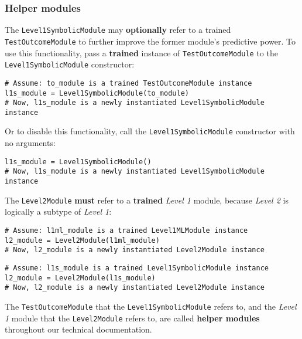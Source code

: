 \documentclass[a4paper]{article}
\begin{document}
\subsubsection{Helper modules} \label{helper_modules}

The \lstinline{Level1SymbolicModule} may \textbf{optionally} refer to a trained \lstinline{TestOutcomeModule} to further improve the former module's predictive power. To use this functionality, pass a \textbf{trained} instance of \lstinline{TestOutcomeModule} to the \lstinline{Level1SymbolicModule} constructor:

\lstset{language=Python}
\begin{lstlisting}
# Assume: to_module is a trained TestOutcomeModule instance
l1s_module = Level1SymbolicModule(to_module)
# Now, l1s_module is a newly instantiated Level1SymbolicModule instance
\end{lstlisting}
\lstset{language=}

Or to disable this functionality, call the \lstinline{Level1SymbolicModule} constructor with no arguments:

\lstset{language=Python}
\begin{lstlisting}
l1s_module = Level1SymbolicModule()
# Now, l1s_module is a newly instantiated Level1SymbolicModule instance
\end{lstlisting}
\lstset{language=}

The \lstinline{Level2Module} \textbf{must} refer to a \textbf{trained} \textit{Level 1} module, because \textit{Level 2} is logically a subtype of \textit{Level 1}:

\lstset{language=Python}
\begin{lstlisting}
# Assume: l1ml_module is a trained Level1MLModule instance
l2_module = Level2Module(l1ml_module)
# Now, l2_module is a newly instantiated Level2Module instance
\end{lstlisting}
\lstset{language=}

\lstset{language=Python}
\begin{lstlisting}
# Assume: l1s_module is a trained Level1SymbolicModule instance
l2_module = Level2Module(l1s_module)
# Now, l2_module is a newly instantiated Level2Module instance
\end{lstlisting}
\lstset{language=}

The \lstinline{TestOutcomeModule} that the \lstinline{Level1SymbolicModule} refers to, and the \textit{Level 1} module that the \lstinline{Level2Module} refers to, are called \textbf{helper modules} throughout our technical documentation.
\end{document}
